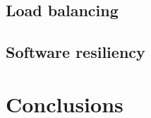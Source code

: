 \documentclass{beamer}
\begin{document}
\subsection{Load balancing}

%
%
\subsection{Software resiliency}

%

\section{Conclusions}


\end{document}
